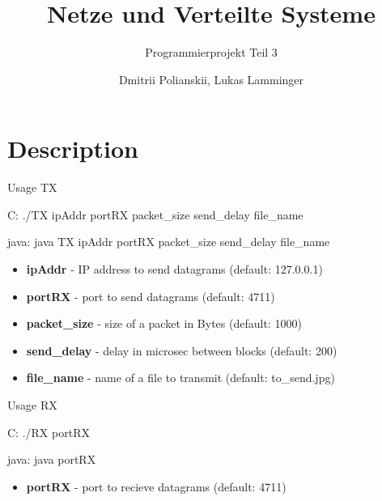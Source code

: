 \documentclass[10pt]{beamer}
\title{Netze und Verteilte Systeme}
\subtitle{Programmierprojekt Teil 3}
\date{}
\author{Dmitrii Polianskii, Lukas Lamminger}
\institute{Universit\"at Salzburg}
\begin{document}
\maketitle



\section{Description}

\begin{frame}[fragile]{Usage TX}
	\begin{block}{C:}
		\hspace*{2mm} \footnotesize 	 ./TX ipAddr portRX packet\_size send\_delay file\_name
	\end{block}

	\begin{block}{java:}
		\hspace*{2mm} \footnotesize 	 java TX ipAddr portRX packet\_size send\_delay file\_name
	\end{block}
		
  \begin{itemize}
  	\footnotesize 	
    \item{\textbf{ipAddr}} - IP address to send datagrams (default: 127.0.0.1)
    \item{\textbf{portRX}} - port to send datagrams (default: 4711)
    \item{\textbf{packet\_size}} - size of a packet in Bytes (default: 1000)
    \item{\textbf{send\_delay}} - delay in microsec between blocks (default: 200)
    \item{\textbf{file\_name}} - name of a file to transmit (default: to\_send.jpg)
  \end{itemize}
\end{frame}

\begin{frame}[fragile]{Usage RX}
	\begin{block}{C:}
		\hspace*{2mm} \footnotesize ./RX portRX
	\end{block}

	\begin{block}{java:}
		\hspace*{2mm} \footnotesize java portRX
	\end{block}
		
  \begin{itemize}
  	\footnotesize 	
    \item{\textbf{portRX}} - port to recieve datagrams (default: 4711)
  \end{itemize}
\end{frame}
\end{document}
